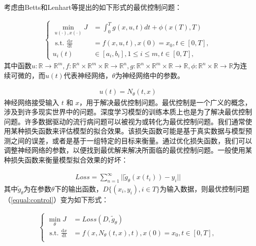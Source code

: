 考虑由Betts和Lenhart等提出的如下形式的最优控制问题：

\begin{gather}
    \left\{\begin{aligned}
        \min _{u(\cdot), x(\cdot)} J & =\int_{0}^{T} g(x, u, t) d t+\phi(x(T), T) \\
        \text { s.t. } \frac{\mathrm{d} x}{\mathrm{dt}} & =f(x, u, t), x(0)=x_{0}, t \in[0, T], \\
        u_{i}(t) & \in\left[a_{i}, b_{i}\right], 1 \leq i \leq m, t \in[0, T],
        \end{aligned}\right.
        \label{equal:control}
\end{gather}
其中函数$u: \mathbb{R} \rightarrow \mathbb{R}^{m}, f: \mathbb{R}^{n} \times \mathbb{R}^{m} \times \mathbb{R} \rightarrow \mathbb{R}^{n}, g: \mathbb{R}^{n} \times \mathbb{R}^{m} \times \mathbb{R} \rightarrow \mathbb{R},\phi : \mathbb{R}^{n} \times \mathbb{R} \rightarrow \mathbb{R}$为连续可微的，而$u(t)$代表神经网络，$\theta$为神经网络中的参数。

\begin{gather}
    u(t)=N_\theta (t,x)
\end{gather}
神经网络接受输入 $t$ 和 $x$，用于解决最优控制问题。最优控制是一个广义的概念，涉及到许多现实世界中的问题。深度学习模型的训练本质上也是为了解决最优控制问题。许多数据驱动的流行病问题可以被视为或转化为最优控制问题。我们通常使用某种损失函数来评估模型的拟合效果。该损失函数可能是基于真实数据与模型预测之间的误差，或者是基于一组特定的目标来衡量。通过优化损失函数，我们可以调整神经网络的参数，以便找到最优解来解决所面临的最优控制问题。一般使用某种损失函数来衡量模型拟合效果的好坏：

\begin{gather}
    Loss=\sum_{n = 1}^{\infty} ||\widetilde{g}_\theta(x(t_i))-y_i|| 
    \label{equal:loss}
\end{gather}
其中$\widetilde{g}_\theta$为在参数$\theta $下的输出函数，$D\{(x_i,y_i),i\in T\}$为输入数据，则最优控制问题（\ref{equal:control}）变为如下形式：

\begin{gather}
    \left\{\begin{aligned}
        \min _{\theta} J & =Loss(D,\widetilde{g}_\theta) \\
        \text { s.t. } \frac{\mathrm{d} x}{\mathrm{dt}} & =f(x, N_\theta (t,x), t), x(0)=x_{0}, t \in[0, T], \\
        \end{aligned}\right.
\end{gather}


